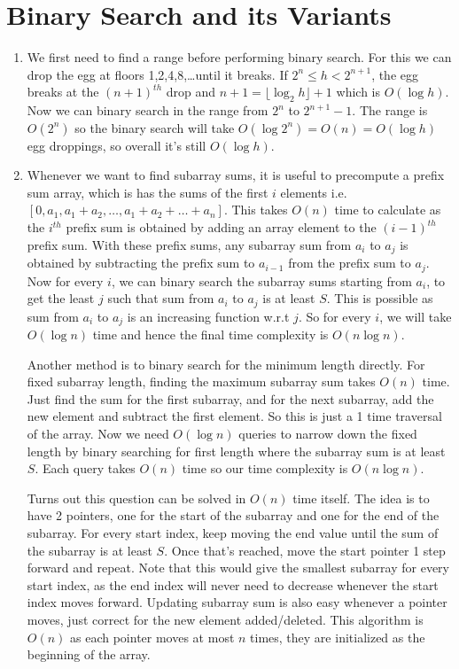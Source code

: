 \documentclass[12pt]{report}
\begin{document}
\section*{\Huge\bfseries Binary Search and its Variants}
\begin{enumerate}[label=\textbf{\arabic*.}]

    \item We first need to find a range before performing binary search. For this we can drop the egg at 
    floors 1,2,4,8,\dots until it breaks. If $2^n \leq h < 2^{n+1}$, the egg breaks at the $(n+1)^{th}$
    drop and $n+1 = \lfloor \log_2 h \rfloor + 1$ which is $O(\log h)$. Now we can binary search in the range from
    $2^n$ to $2^{n+1}-1$. The range is $O(2^n)$ so the binary search will take $O(\log 2^n) = O(n) = O(\log h)$
    egg droppings, so overall it's still $O(\log h)$.

    \item Whenever we want to find subarray sums, it is useful to precompute a prefix sum array, which is
    has the sums of the first $i$ elements i.e. $[0, a_1, a_1+a_2, \dots, a_1+a_2+\dots+a_n]$. This takes 
    $O(n)$ time to calculate as the $i^{th}$ prefix sum is obtained by adding an array element to the $(i-1)^{th}$
    prefix sum. With these prefix sums, any subarray sum from $a_i$ to $a_j$ is obtained by subtracting the prefix
    sum to $a_{i-1}$ from the prefix sum to $a_j$. Now for every $i$, we can binary search the subarray sums
    starting from $a_i$, to get the least $j$ such that sum from $a_i$ to $a_j$ is at least $S$. This is 
    possible as sum from $a_i$ to $a_j$ is an increasing function w.r.t $j$. So for every $i$, we will take
    $O(\log n)$ time and hence the final time complexity is $O(n \log n)$.

    Another method is to binary search for the minimum length directly. For fixed subarray length, finding the
    maximum subarray sum takes $O(n)$ time. Just find the sum for the first subarray, and for the next subarray,
    add the new element and subtract the first element. So this is just a 1 time traversal of the array. Now we 
    need $O(\log n)$ queries to narrow down the fixed length by binary searching for first length where the subarray
    sum is at least $S$. Each query takes $O(n)$ time so our time complexity is $O(n \log n)$.

    Turns out this question can be solved in $O(n)$ time itself. The idea is to have 2 pointers, one for the start 
    of the subarray and one for the end of the subarray. For every start index, keep moving the end value until 
    the sum of the subarray is at least $S$. Once that's reached, move the start pointer 1 step forward and repeat. Note that 
    this would give the smallest subarray for every start index, as the end index will never need to decrease whenever 
    the start index moves forward. Updating subarray sum is also easy whenever a pointer moves, just correct for
    the new element added/deleted. This algorithm is $O(n)$ as each pointer moves at most $n$ times, they are initialized as 
    the beginning of the array.


\end{enumerate}
\end{document}
